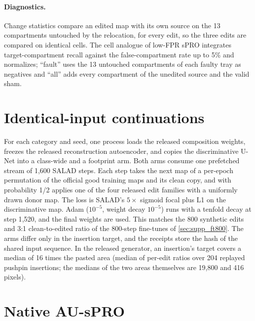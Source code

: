 \paragraph{Diagnostics.} Change statistics compare an edited map with its own source on the 13 compartments untouched by the relocation, for every edit, so the three edits are compared on identical cells. The cell analogue of low-FPR sPRO integrates target-compartment recall against the false-compartment rate up to 5\% and normalizes; ``fault'' uses the 13 untouched compartments of each faulty tray as negatives and ``all'' adds every compartment of the unedited source and the valid sham.

\section{Identical-input continuations}
\label{sec:supp_ft}
For each category and seed, one process loads the released composition weights, freezes the released reconstruction autoencoder, and copies the discriminative U-Net into a class-wide and a footprint arm. Both arms consume one prefetched stream of 1{,}600 SALAD steps. Each step takes the next map of a per-epoch permutation of the official good training maps and its clean copy, and with probability 1/2 applies one of the four released edit families with a uniformly drawn donor map. The loss is SALAD's $5\times$ sigmoid focal plus L1 on the discriminative map. Adam ($10^{-5}$, weight decay $10^{-5}$) runs with a tenfold decay at step 1{,}520, and the final weights are used. This matches the 800 synthetic edits and 3:1 clean-to-edited ratio of the 800-step fine-tunes of \cref{sec:supp_ft800}. The arms differ only in the insertion target, and the receipts store the hash of the shared input sequence. In the released generator, an insertion's target covers a median of 16 times the pasted area (median of per-edit ratios over 204 replayed pushpin insertions; the medians of the two areas themselves are 19{,}800 and 416 pixels).

\section{Native AU-sPRO}
\label{sec:supp_native}
